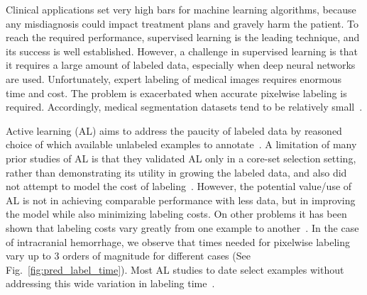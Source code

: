 \documentclass{llncs}
\begin{document}
Clinical applications set very high bars for machine learning algorithms, because any misdiagnosis could impact treatment plans and gravely harm the patient. %
To reach the required performance, supervised learning is the leading technique, and its success is well established. However, a challenge in supervised learning is that it requires a large amount of labeled data, especially when deep neural networks are used. %
Unfortunately, expert labeling of medical images requires enormous time and cost. The problem is exacerbated when accurate pixelwise labeling is required. Accordingly, medical segmentation datasets tend to be relatively small~\cite{sirinukunwattana2017gland,zhang2016coarse}.  

Active learning (AL) aims to address the paucity of labeled data by reasoned choice of which available unlabeled examples to annotate~\cite{settles2008active,yang2017suggestive,seung1992query,lewis1994sequential,mahapatra2013semi}. A limitation of many prior studies of AL is that they validated AL only in a core-set selection setting,~\cite{sener2018active} %
rather than demonstrating its utility in growing the labeled data, and also did not attempt to model the cost of labeling~\cite{settles2008active,yang2017suggestive,mahapatra2013semi}. However, the potential value/use of AL is not in achieving comparable performance with less data, but in improving the model while also minimizing labeling costs.  On other problems it has been shown that labeling costs vary greatly from one example to another~\cite{settles2008active,settles2012active,tomanek2010resource}. In the case of intracranial hemorrhage, we observe that times needed for pixelwise labeling vary up to 3 orders of magnitude for different cases (See Fig.~\ref{fig:pred_label_time}). Most AL studies to date select examples without addressing this wide variation in labeling time~\cite{yang2017suggestive,seung1992query,lewis1994sequential,sener2018active,mahapatra2013semi}.%
\end{document}
